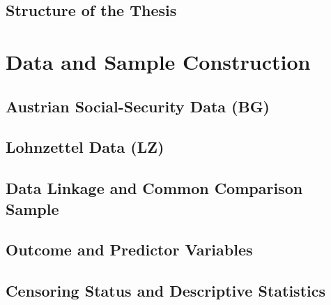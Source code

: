 \documentclass[12pt,a4paper,oneside,titlepage]{book}
\newif\ifthesisdraft
\newcommand{\draftnote}[1]{%
  \ifthesisdraft
    \par\noindent\colorbox{yellow!20}{%
      \parbox{0.94\textwidth}{\textbf{Draft note:} #1}%
    }\par
  \fi
}
\begin{document}
\section{Structure of the Thesis}
\draftnote{Give a short roadmap of the remaining chapters.}

\chapter{Data and Sample Construction}
\label{ch:data}

\section{Austrian Social-Security Data (BG)}
\draftnote{Describe coverage, unit of observation, wage measurement, legal contribution ceilings, worker and job characteristics, and the historical period used.}

\section{Lohnzettel Data (LZ)}
\draftnote{Explain that LZ provides uncensored wage information, supplies the model target, and serves as the evaluation benchmark. Define annual and daily LZ wages carefully.}

\section{Data Linkage and Common Comparison Sample}
\draftnote{Document linkage keys, eligibility restrictions, the 1994--2012 period, duplicate handling, missing-value rules, and the final common BG--LZ comparison sample. Base this chapter on the corrected Version 3 data pipeline.}

\section{Outcome and Predictor Variables}
\draftnote{Define the log daily-wage target and group predictors by worker characteristics, current employment, wage history, and establishment characteristics. Distinguish the Tobit V1 specification from the XGBoost V1 and V4 feature sets.}

\section{Censoring Status and Descriptive Statistics}
\draftnote{Report sample sizes, the censored share, wage distributions, and key differences between censored and uncensored observations. Use only aggregate outputs.}
\end{document}
